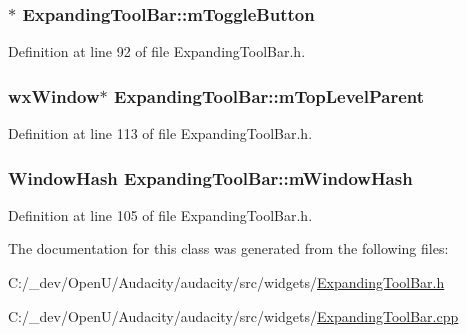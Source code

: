 \subsubsection[{\texorpdfstring{m\+Toggle\+Button}{mToggleButton}}]{$\ast$ Expanding\+Tool\+Bar\+::m\+Toggle\+Button\hspace{0.3cm}{\ttfamily [protected]}}\hypertarget{class_expanding_tool_bar_ac00f7ae38ce9f5d7a98bd13f3af748bc}{}\label{class_expanding_tool_bar_ac00f7ae38ce9f5d7a98bd13f3af748bc}


Definition at line 92 of file Expanding\+Tool\+Bar.\+h.

\subsubsection[{\texorpdfstring{m\+Top\+Level\+Parent}{mTopLevelParent}}]{\setlength{\rightskip}{0pt plus 5cm}wx\+Window$\ast$ Expanding\+Tool\+Bar\+::m\+Top\+Level\+Parent\hspace{0.3cm}{\ttfamily [protected]}}\hypertarget{class_expanding_tool_bar_a062e8b1b2eb909c73b24638f05027c18}{}\label{class_expanding_tool_bar_a062e8b1b2eb909c73b24638f05027c18}


Definition at line 113 of file Expanding\+Tool\+Bar.\+h.

\subsubsection[{\texorpdfstring{m\+Window\+Hash}{mWindowHash}}]{\setlength{\rightskip}{0pt plus 5cm}Window\+Hash Expanding\+Tool\+Bar\+::m\+Window\+Hash\hspace{0.3cm}{\ttfamily [protected]}}\hypertarget{class_expanding_tool_bar_a42aeff8120f7e0b22abf586f6f9b930e}{}\label{class_expanding_tool_bar_a42aeff8120f7e0b22abf586f6f9b930e}


Definition at line 105 of file Expanding\+Tool\+Bar.\+h.



The documentation for this class was generated from the following files\+:\begin{DoxyCompactItemize}
\item 
C\+:/\+\_\+dev/\+Open\+U/\+Audacity/audacity/src/widgets/\hyperlink{_expanding_tool_bar_8h}{Expanding\+Tool\+Bar.\+h}\item 
C\+:/\+\_\+dev/\+Open\+U/\+Audacity/audacity/src/widgets/\hyperlink{_expanding_tool_bar_8cpp}{Expanding\+Tool\+Bar.\+cpp}\end{DoxyCompactItemize}
